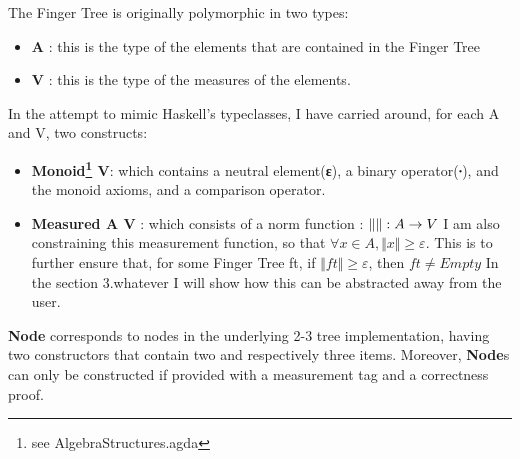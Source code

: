 \documentclass[12pt,twoside,notitlepage]{report}
\renewcommand{\geq}{\geqslant}
\begin{document}
The Finger Tree is originally polymorphic in two types:
\begin{itemize}

\item \textbf{A} : this is the type of the elements that are contained in the Finger Tree 
\item \textbf{V} : this is the type of the measures of the elements. 

\end{itemize} 


In the attempt to mimic Haskell's typeclasses, I have carried around, for each A and V, two constructs:

\begin{itemize} 
\item \textbf{Monoid\footnote{see AlgebraStructures.agda} V}: which contains a neutral element(\textbf{ε}), a binary operator(\textbf{∙}), and the monoid axioms, and a comparison operator.
\item \textbf{Measured A V} : which consists of a norm function  :  \textbf{$\Vert \Vert : \nolinebreak A \rightarrow V$}
I am also constraining this measurement function, so that $\forall x \in A, \Vert x \Vert \geq \varepsilon $. This is to further ensure that, for some Finger Tree ft, if $ \Vert ft \Vert \geq \varepsilon$, then $ft \neq Empty$ 
In the section 3.whatever I will show how this can be abstracted away from the user. 


\end{itemize} 


\textbf{Node} corresponds to nodes in the underlying 2-3 tree implementation, having two constructors that contain two and respectively three items. Moreover, \textbf{Node}s can only be constructed if provided with a measurement tag and a correctness proof.
  
\end{document}
